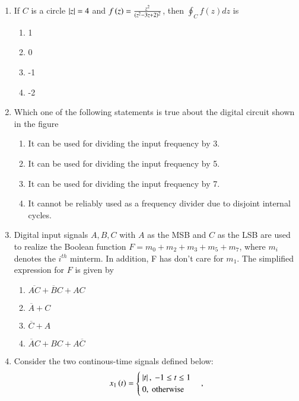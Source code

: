 \documentclass[journal]{IEEEtran}
\begin{document}
\begin{enumerate}
\begin{enumerate}
\end{enumerate}
\item If $C$ is a circle $\left\vert z\right\vert = 4$ and $f\left(z\right) = \frac{z^2}{(z^2 - 3z + 2)^2}$, then $\oint_C f(z) dz$ is
\begin{enumerate}
    \item 1
    \item 0
    \item -1
    \item -2
\end{enumerate}
\item Which one of the following statements is true about the digital circuit shown in the figure
\begin{figure}[!ht]
\centering
    \label{fig:digital circuit}
    \end{figure}
\begin{enumerate}
    \item It can be used for dividing the input frequency by 3.
    \item It can be used for dividing the input frequency by 5.
    \item It can be used for dividing the input frequency by 7.
    \item It cannot be reliably used as a frequency divider due to disjoint internal cycles.
\end{enumerate}
  \item Digital input signals $A, B, C$ with $A$ as the MSB and $C$ as the LSB are used to realize the Boolean function $F = m_0 + m_2 + m_3 + m_5 + m_7$, where $m_i$ denotes the $i^{th}$ minterm. In addition, F has don't care for $m_1$. The simplified expression for $F$ is given by 
  \begin{enumerate}
      \item $\overline{AC} + \overline{B}C + AC$
      \item $\overline{A} + C$
      \item $\overline{C} + A$
      \item $\overline{A}C + BC + A\overline{C}$
  \end{enumerate}
  \item Consider the two continous-time signals defined below:
  \begin{align}
      x_1\brak{t}=\begin{cases}
      \abs{t}, \ -1 \leq t \leq 1 \\ 0, \ \text{otherwise}
      \end{cases} ,

\end{align}
\end{enumerate}
\end{document}
